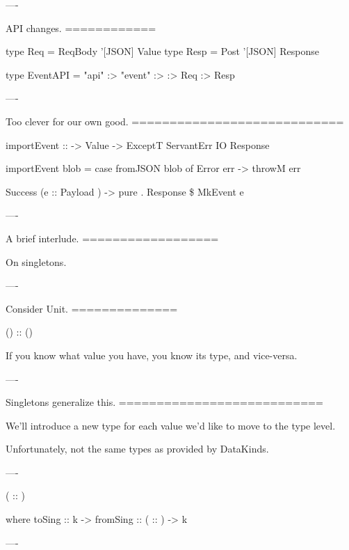 ----

API changes.
============

\begin{raw}
  type Req  = ReqBody '[JSON] Value
  type Resp = Post    '[JSON] Response

  type EventAPI =
    "api" :>
      "event" :>
         :> Req :> Resp
\end{raw}

----

Too clever for our own good.
============================

\begin{raw}
  importEvent :: 
              -> Value
              -> ExceptT ServantErr IO Response

  importEvent  blob =
    case fromJSON blob of
      Error err ->
        throwM err

      Success (e :: Payload ) ->
        pure . Response \$ MkEvent e
\end{raw}

----

A brief interlude.
==================

On singletons.

----

Consider Unit.
==============

\begin{hs}
  () :: ()
\end{hs}

If you know what value you have, you know its type, and vice-versa.

----

Singletons generalize this.
===========================

We'll introduce a new type for each value we'd like to move to the type level.

Unfortunately, not the same types as provided by DataKinds.

----

\begin{custom}

    ( :: )

     where
    toSing   :: k ->  
    fromSing ::  ( :: ) -> k
\end{custom}

----

